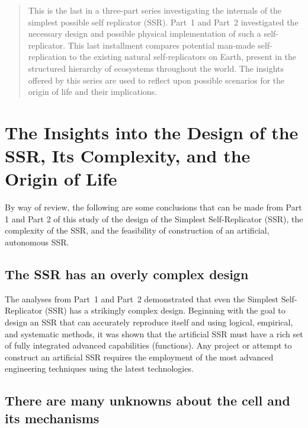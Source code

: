 
\begin{abstract}
This is the last in a three-part series investigating the internals 
of the simplest possible self replicator (SSR).  
Part~1 and Part~2
investigated the necessary design and possible physical implementation of 
such a self-replicator.
This last installment compares potential man-made self-replication
to the existing natural self-replicators on Earth, present in the 
structured hierarchy of ecosystems throughout the world.
The insights offered by this series are used to
reflect upon possible scenarios for the origin of life and their implications.
\end{abstract}


\section[Insights into the Design]{The Insights into the Design of the SSR, Its Complexity, and the Origin of Life}

By way of review, the following are some conclusions that can be made 
from Part 1 and Part 2 of this study of the design of the
Simplest Self-Replicator (SSR), the complexity of the SSR, and the feasibility of construction of
an artificial, autonomous SSR.

\subsection{The SSR has an overly complex design}

The analyses from Part~1 and Part~2 demonstrated that even the Simplest Self-Replicator (SSR)
has a strikingly complex design. 
Beginning with the goal to design an SSR that can accurately reproduce itself and using logical, empirical, and systematic methods, it was shown that the artificial 
SSR must have a rich set of fully integrated advanced
capabilities (functions).  Any project or attempt to construct an
artificial SSR requires the employment of the most advanced engineering
techniques using the latest technologies.

\subsection{There are many unknowns about the cell and its mechanisms}

